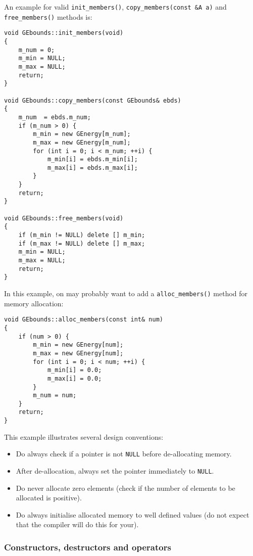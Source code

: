 \documentclass{article}[12pt,a4]
\begin{document}
An example for valid {\tt init\_members()}, {\tt copy\_members(const \&A a)} and
{\tt free\_members()} methods is:
\begin{verbatim}
void GEbounds::init_members(void)
{
    m_num = 0;
    m_min = NULL;
    m_max = NULL;
    return;
}

void GEbounds::copy_members(const GEbounds& ebds)
{
    m_num  = ebds.m_num;
    if (m_num > 0) {
        m_min = new GEnergy[m_num];
        m_max = new GEnergy[m_num];
        for (int i = 0; i < m_num; ++i) {
            m_min[i] = ebds.m_min[i];
            m_max[i] = ebds.m_max[i];
        }
    }
    return;
}

void GEbounds::free_members(void)
{
    if (m_min != NULL) delete [] m_min;
    if (m_max != NULL) delete [] m_max;
    m_min = NULL;
    m_max = NULL;
    return;
}
\end{verbatim}
In this example, on may probably want to add a {\tt alloc\_members()} method for memory allocation:
\begin{verbatim}
void GEbounds::alloc_members(const int& num)
{
    if (num > 0) {
        m_min = new GEnergy[num];
        m_max = new GEnergy[num];
        for (int i = 0; i < num; ++i) {
            m_min[i] = 0.0;
            m_max[i] = 0.0;
        }
        m_num = num;
    }
    return;
}
\end{verbatim}
This example illustrates several design conventions:
\begin{itemize}
\item Do always check if a pointer is not {\tt NULL} before de-allocating memory.
\item After de-allocation, always set the pointer immediately to {\tt NULL}.
\item Do never allocate zero elements (check if the number of elements to be allocated is positive).
\item Do always initialise allocated memory to well defined values (do not expect that the compiler
will do this for your).
\end{itemize}


\subsubsection{Constructors, destructors and operators}
\end{document}
